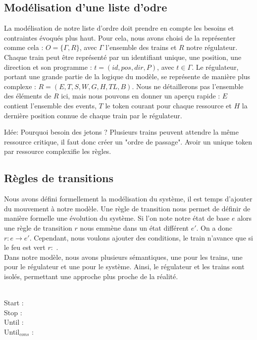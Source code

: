 \documentclass[runningheads]{llncs}
\begin{document}
\subsection{Modélisation d'une liste d'odre}
La modélisation de notre liste d'ordre doit prendre en compte les besoins et contraintes évoqués plus haut.
Pour cela, nous avons choisi de la représenter comme cela : $O = \{\Gamma, R\}$, avec $\Gamma$ l'ensemble des trains et $R$ notre régulateur.
Chaque train peut être représenté par un identifiant unique, une position, une direction et son programme : $t = (id, pos, dir, P)$, avec $t \in \Gamma$.
Le régulateur, portant une grande partie de la logique du modèle, se représente de manière plus complexe : $R = (E,T,S,W,G,H,TL,B)$.
Nous ne détaillerons pas l'ensemble des éléments de $R$ ici, mais nous pouvons en donner un aperçu rapide : $E$ contient l'ensemble des events,
$T$ le token courant pour chaque ressource et $H$ la dernière position connue de chaque train par le régulateur.

Idée: Pourquoi besoin des jetons ? Plusieurs trains peuvent attendre la même ressource critique, il faut donc créer un "ordre de passage".
Avoir un unique token par ressource complexifie les règles.


\subsection{Règles de transitions}
Nous avons défini formellement la modélisation du système, il est temps d'ajouter du mouvement à notre modèle.
Une règle de transition nous permet de définir de manière formelle une évolution du système. 
Si l'on note notre état de base $e$ alors une règle de transition $r$ nous emmène dans un état différent $e'$. On a donc $r: e \rightarrow e'$.
Cependant, nous voulons ajouter des conditions, le train n'avance que si le feu est vert $r:$ .
\\Dans notre modèle, nous avons plusieurs sémantiques, une pour les trains, une pour le régulateur et une pour le système.
Ainsi, le régulateur et les trains sont isolés, permettant une approche plus proche de la réalité.

\noindent
\\Start : 
\\Stop : 
\\Until : 
\\Until$_{cons}$ : 
\end{document}
